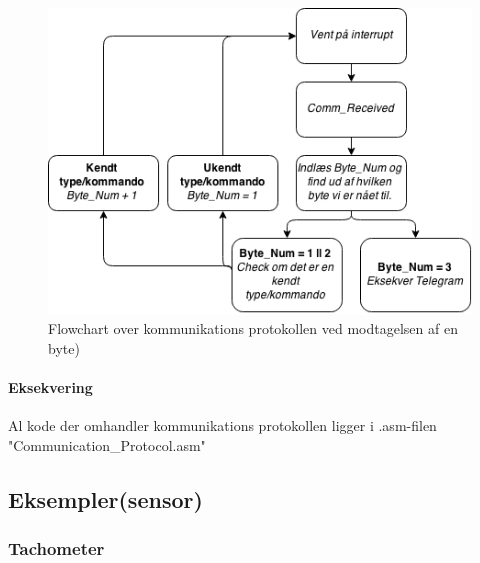 \begin{figure}[h]

	\centering
		\includegraphics[scale=0.65]{Billeder/Comm_Modtagelse.png}
	\caption{Flowchart over kommunikations protokollen ved modtagelsen af en byte)}
	\label{fig:Comm_Modtagelse}
	
\end{figure}

\paragraph{Eksekvering}

Al kode der omhandler kommunikations protokollen ligger i .asm-filen "Communication\_Protocol.asm"

\subsection{Eksempler(sensor)}

\subsubsection{Tachometer}

